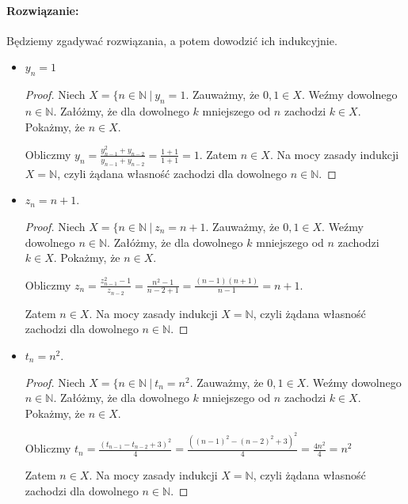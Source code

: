 \documentclass{article}
\newenvironment{rozw}{\paragraph{Rozwiązanie:}}{\hfill}
\begin{document}
\begin{rozw}

Będziemy zgadywać rozwiązania, a potem dowodzić ich indukcyjnie.
\begin{itemize}

\item $y_n = 1$

\begin{proof}

Niech $X = \lbrace n \in \mathbb{N} \ | \ y_n = 1$. Zauważmy, że $0, 1 \in X$. Weźmy dowolnego $n \in \mathbb{N}$. Załóżmy, że dla dowolnego $k$ mniejszego od $n$ zachodzi $k \in X$. Pokażmy, że $n \in X$.

Obliczmy $y_n = \frac{y_{n-1}^2 + y_{n-2}}{y_{n-1} + y_{n-2}} = \frac{1+1}{1+1} = 1$. Zatem $n \in X$. Na mocy zasady indukcji $X = \mathbb{N}$, czyli żądana własność zachodzi dla dowolnego $n \in \mathbb{N}$.

\end{proof}

\item $z_n = n+1$.

\begin{proof}
Niech $X = \lbrace n \in \mathbb{N} \ | \ z_n = n+1$. Zauważmy, że $0, 1 \in X$. Weźmy dowolnego $n \in \mathbb{N}$. Załóżmy, że dla dowolnego $k$ mniejszego od $n$ zachodzi $k \in X$. Pokażmy, że $n \in X$.

Obliczmy $z_n = \frac{z_{n-1}^2 - 1}{z_{n-2}} = \frac{n^2 - 1}{n-2+1} = \frac{(n-1)(n+1)}{n-1} = n+1$. 

Zatem $n \in X$. Na mocy zasady indukcji $X = \mathbb{N}$, czyli żądana własność zachodzi dla dowolnego $n \in \mathbb{N}$.
\end{proof}


\item $t_n = n^2$.

\begin{proof}
Niech $X = \lbrace n \in \mathbb{N} \ | \ t_n = n^2$. Zauważmy, że $0, 1 \in X$. Weźmy dowolnego $n \in \mathbb{N}$. Załóżmy, że dla dowolnego $k$ mniejszego od $n$ zachodzi $k \in X$. Pokażmy, że $n \in X$.

Obliczmy $t_n =  \frac{(t_{n-1} - t_{n-2} + 3)^2}{4} = \frac{((n-1)^2 - (n-2)^2 +3)^2}{4} = \frac{4n^2}{4} = n^2$

Zatem $n \in X$. Na mocy zasady indukcji $X = \mathbb{N}$, czyli żądana własność zachodzi dla dowolnego $n \in \mathbb{N}$.
\end{proof}


\end{itemize}

\end{rozw}

\end{document}
